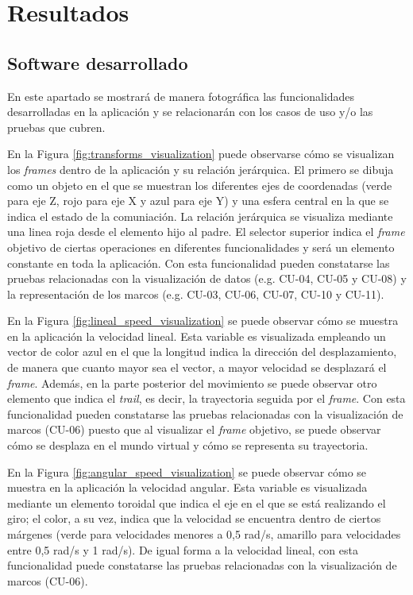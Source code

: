 \chapter{Resultados} \label{chapter:resultados}
\section{Software desarrollado}
En este apartado se mostrará de manera fotográfica las funcionalidades desarrolladas en la aplicación y se relacionarán con los 
casos de uso y/o las pruebas que cubren.

En la Figura \ref{fig:transforms_visualization} puede observarse cómo se visualizan los \textit{frames} dentro de la aplicación y su relación 
jerárquica. El primero se dibuja como un objeto en el que se muestran los diferentes ejes de coordenadas 
(verde para eje Z, rojo para eje X y azul para eje Y) y una esfera central en la que se indica el 
estado de la comuniación. La relación jerárquica se visualiza mediante una linea roja desde el elemento hijo al padre. El selector superior 
indica el \textit{frame} objetivo de ciertas operaciones en diferentes funcionalidades y será un elemento constante en toda la aplicación.
Con esta funcionalidad pueden constatarse las pruebas relacionadas con la visualización de datos (e.g. CU-04, CU-05 y CU-08) y
la representación de los marcos (e.g. CU-03, CU-06, CU-07, CU-10 y CU-11).

En la Figura \ref{fig:lineal_speed_visualization} se puede observar cómo se muestra en la aplicación la velocidad lineal. Esta variable es 
visualizada empleando un vector de color azul en el que la longitud indica la dirección del desplazamiento, de manera que cuanto mayor sea el vector, 
a mayor velocidad se desplazará el \textit{frame}. Además, en la parte posterior del movimiento se puede observar otro elemento que indica el \textit{trail}, es decir,
la trayectoria seguida por el \textit{frame}. 
Con esta funcionalidad pueden constatarse las pruebas relacionadas con la visualización de marcos (CU-06) puesto que al 
visualizar el \textit{frame} objetivo, se puede observar cómo se desplaza en el mundo virtual y cómo se representa su trayectoria.

En la Figura \ref{fig:angular_speed_visualization} se puede observar cómo se muestra en la aplicación la velocidad angular. Esta variable 
es visualizada mediante un elemento toroidal que indica el eje en el que se está realizando el giro; el color, a su vez, indica que la velocidad 
se encuentra dentro de ciertos márgenes (verde para velocidades menores a 0,5 rad/s, amarillo para velocidades entre 0,5 rad/s y 1 rad/s).
De igual forma a la velocidad lineal, con esta funcionalidad puede constatarse las pruebas relacionadas con la visualización de marcos (CU-06).

